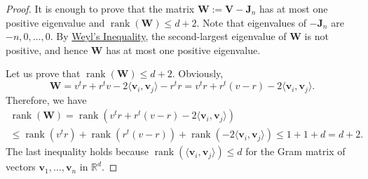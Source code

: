 \documentclass[a4paper, oneside, reqno, 12pt]{amsart}
\theoremstyle{plain}
\theoremstyle{definition}
\DeclareMathOperator{\rank}{rank}
\begin{document}
\begin{proof}
It is enough to prove that the matrix $\mathbf W:=\mathbf V-\mathbf J_n$ has at most one positive eigenvalue and $\rank (\mathbf W)\leq d+2$. Note that eigenvalues of $-\mathbf J_n$ are $-n, 0,\dots, 0$. By \hyperref[theorem:sumofHermitian]{Weyl's Inequality}, the second-largest eigenvalue of $\mathbf W$ is not positive, and hence $\mathbf W$ has at most one positive eigenvalue.

Let us prove that $\rank(\mathbf W)\leq d+2$. Obviously,
\[
\mathbf W=v^tr+r^t v-2\langle \mathbf v_i, \mathbf v_j\rangle-r^tr=v^tr+r^t(v-r)-2\langle \mathbf v_i,\mathbf v_j\rangle.
\]
Therefore, we have 
\begin{gather*}
\rank(\mathbf W)=\rank\left(v^tr+r^t(v-r)-2\langle \mathbf v_i, \mathbf v_j\rangle\right)
\\ 
\leq\rank (v^t r)+\rank(r^t(v-r))+\rank (-2\langle \mathbf v_i, \mathbf v_j\rangle)\leq 1+1+d=d+2.
\end{gather*}
The last inequality holds because %
$\rank (\langle\mathbf v_i,\mathbf v_j\rangle)\leq d$ for the Gram matrix of vectors $\mathbf v_1,\dots, \mathbf v_n$ in $\mathbb R^d$.
\end{proof}
\end{document}
